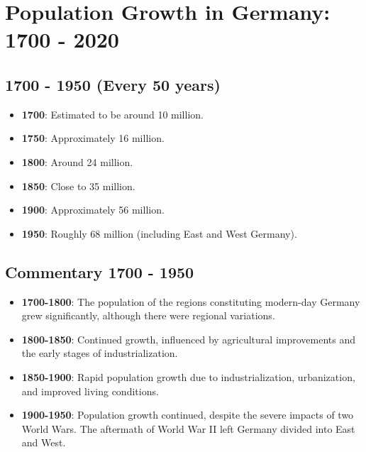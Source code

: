 \section*{Population Growth in Germany: 1700 - 2020}

\subsection*{1700 - 1950 (Every 50 years)}
\begin{itemize}
    \item \textbf{1700}: Estimated to be around 10 million. 
    \item \textbf{1750}: Approximately 16 million.
    \item \textbf{1800}: Around 24 million.
    \item \textbf{1850}: Close to 35 million.
    \item \textbf{1900}: Approximately 56 million.
    \item \textbf{1950}: Roughly 68 million (including East and West Germany).
\end{itemize}

\subsection*{Commentary 1700 - 1950}
\begin{itemize}
    \item \textbf{1700-1800}: The population of the regions constituting modern-day Germany grew significantly, although there were regional variations.
    \item \textbf{1800-1850}: Continued growth, influenced by agricultural improvements and the early stages of industrialization.
    \item \textbf{1850-1900}: Rapid population growth due to industrialization, urbanization, and improved living conditions.
    \item \textbf{1900-1950}: Population growth continued, despite the severe impacts of two World Wars. The aftermath of World War II left Germany divided into East and West.
\end{itemize}

